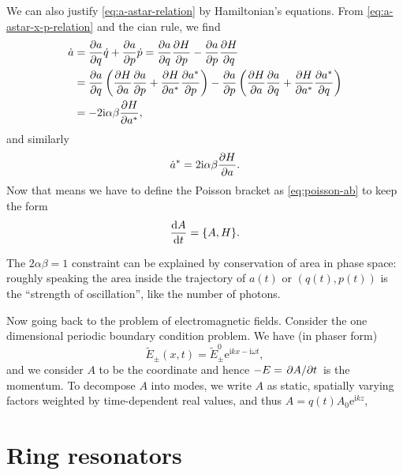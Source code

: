 \documentclass[hyperref, a4paper]{article}
\newcommand*{\ii}{\mathrm{i}}
\newcommand*{\ee}{\mathrm{e}}
\begin{document}
We can also justify \eqref{eq:a-astar-relation} by Hamiltonian's equations.
From \eqref{eq:a-astar-x-p-relation} and the cian rule, we find 
\begin{equation}
    \begin{aligned}
    \dot{a} &= \pdv{a}{q} \dot{q} + \pdv{a}{p} \dot{p}
    = \pdv{a}{q} \pdv{H}{p} - \pdv{a}{p} \pdv{H}{q} \\
    &= \pdv{a}{q} \left(\pdv{H}{a} \pdv{a}{p} + \pdv{H}{a^*} \pdv{a^*}{p}\right)
    - \pdv{a}{p}  \left(\pdv{H}{a} \pdv{a}{q} + \pdv{H}{a^*} \pdv{a^*}{q}\right) \\
    &= - 2 \ii \alpha \beta \pdv{H}{a^*},
    \end{aligned}
\end{equation}
and similarly 
\begin{equation}
    \dot{a}^* = 2 \ii \alpha \beta \pdv{H}{a}.
\end{equation}
Now that means we have to define the Poisson bracket as  \eqref{eq:poisson-ab}
to keep the form 
\begin{equation}
    \dv{A}{t} = \poissonbracket{A}{H}.
\end{equation}

The $2 \alpha \beta = 1$ constraint can be explained by conservation of area in phase space: 
roughly speaking the area inside the trajectory of $a(t)$ or $(q(t), p(t))$ 
is the ``strength of oscillation'', like the number of photons.

Now going back to the problem of electromagnetic fields.
Consider the one dimensional periodic boundary condition problem.
We have (in phaser form)
\begin{equation}
    \tilde{E}_\pm(x, t) = \tilde{E}_\pm^0 \ee^{\ii k x - \ii \omega t}, 
\end{equation}
and we consider $A$ to be the coordinate and hence $-E = \pdv*{A}{t}$ is the momentum.
To decompose $A$ into modes, we write $A$ as static, spatially varying factors weighted by time-dependent real values,
and thus $A = q(t) A_0 \ee^{\ii k z}$, 

\section{Ring resonators}
\end{document}
